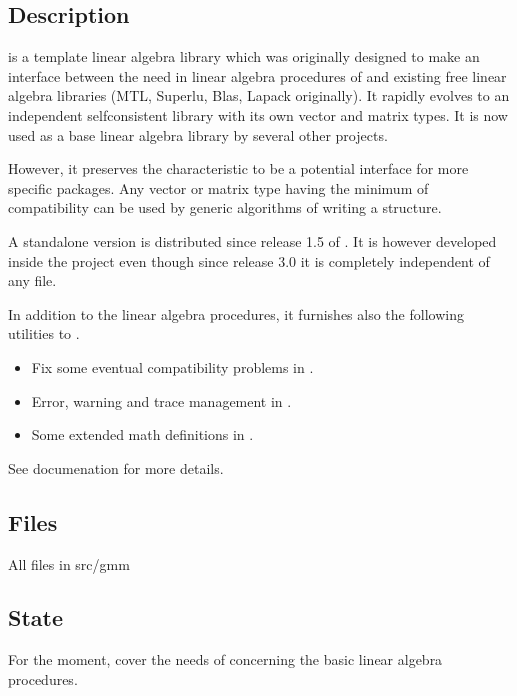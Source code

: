 \documentclass[a4paper,11pt,english]{sphinxmanual}
\begin{document}
\subsection{Description}
\label{\detokenize{project/libdesc_gmm:description}}
 is a template linear algebra library which was originally designed to make an
interface between the need in linear algebra procedures of  and existing free
linear algebra libraries (MTL, Superlu, Blas, Lapack originally). It rapidly
evolves to an independent self\sphinxhyphen{}consistent library with its own vector and matrix
types. It is now used as a base linear algebra library by several other projects.

However, it preserves the characteristic to be a potential interface for more
specific packages. Any vector or matrix type having the minimum of compatibility
can be used by generic algorithms of  writing a  structure.

A  standalone version is distributed since release 1.5 of . It is
however developed inside the  project even though since release 3.0 it is
completely independent of any  file.

In addition to the linear algebra procedures, it furnishes also the following
utilities to .
\begin{itemize}
\item {} 
Fix some eventual compatibility problems in .

\item {} 
Error, warning and trace management in .

\item {} 
Some extended math definitions in .

\end{itemize}

See  documenation for more details.


\subsection{Files}
\label{\detokenize{project/libdesc_gmm:files}}
All files in src/gmm


\subsection{State}
\label{\detokenize{project/libdesc_gmm:state}}
For the moment,  cover the needs of  concerning the basic linear algebra
procedures.
\end{document}
